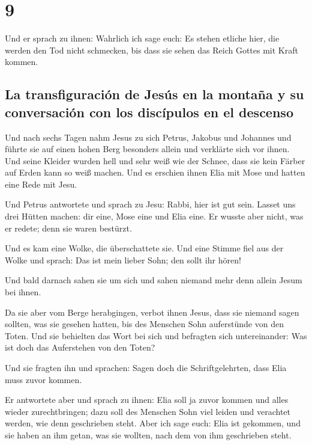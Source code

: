 \hypertarget{section-8}{%
\section{9}\label{section-8}}

 Und er sprach zu ihnen: Wahrlich ich sage euch: Es stehen
etliche hier, die werden den Tod nicht schmecken, bis dass sie sehen das
Reich Gottes mit Kraft kommen.

\hypertarget{la-transfiguraciuxf3n-de-jesuxfas-en-la-montauxf1a-y-su-conversaciuxf3n-con-los-discuxedpulos-en-el-descenso}{%
\subsection{La transfiguración de Jesús en la montaña y su conversación
con los discípulos en el
descenso}\label{la-transfiguraciuxf3n-de-jesuxfas-en-la-montauxf1a-y-su-conversaciuxf3n-con-los-discuxedpulos-en-el-descenso}}

 Und nach sechs Tagen nahm Jesus zu sich Petrus, Jakobus
und Johannes und führte sie auf einen hohen Berg besonders allein und
verklärte sich vor ihnen.  Und seine Kleider wurden hell
und sehr weiß wie der Schnee, dass sie kein Färber auf Erden kann so
weiß machen.  Und es erschien ihnen Elia mit Mose und
hatten eine Rede mit Jesu.

 Und Petrus antwortete und sprach zu Jesu: Rabbi, hier ist
gut sein. Lasset uns drei Hütten machen: dir eine, Mose eine und Elia
eine.  Er wusste aber nicht, was er redete; denn sie waren
bestürzt.

 Und es kam eine Wolke, die überschattete sie. Und eine
Stimme fiel aus der Wolke und sprach: Das ist mein lieber Sohn; den
sollt ihr hören!

 Und bald darnach sahen sie um sich und sahen niemand mehr
denn allein Jesum bei ihnen.

 Da sie aber vom Berge herabgingen, verbot ihnen Jesus,
dass sie niemand sagen sollten, was sie gesehen hatten, bis des Menschen
Sohn auferstünde von den Toten.  Und sie behielten das
Wort bei sich und befragten sich untereinander: Was ist doch das
Auferstehen von den Toten?

 Und sie fragten ihn und sprachen: Sagen doch die
Schriftgelehrten, dass Elia muss zuvor kommen.

 Er antwortete aber und sprach zu ihnen: Elia soll ja
zuvor kommen und alles wieder zurechtbringen; dazu soll des Menschen
Sohn viel leiden und verachtet werden, wie denn geschrieben steht.
 Aber ich sage euch: Elia ist gekommen, und sie haben an
ihm getan, was sie wollten, nach dem von ihm geschrieben steht.

